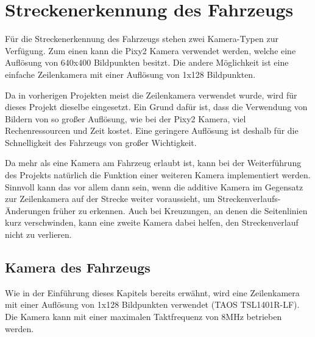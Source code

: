 

\pagestyle{fancy}
\rhead{\thepage} \chead{} 
\cfoot{}

\section{Streckenerkennung des Fahrzeugs}\label{Sec7}

Für die Streckenerkennung des Fahrzeugs stehen zwei Kamera-Typen zur Verfügung. Zum einen kann die Pixy2 Kamera verwendet werden, welche eine Auflösung von 640x400 Bildpunkten besitzt. Die andere Möglichkeit ist eine einfache Zeilenkamera mit einer Auflösung von 1x128 Bildpunkten.\vspace{11pt}

Da in vorherigen Projekten meist die Zeilenkamera verwendet wurde, wird für dieses Projekt dieselbe eingesetzt. Ein Grund dafür ist, dass die Verwendung von Bildern von so großer Auflösung, wie bei der Pixy2 Kamera, viel Rechenressourcen und Zeit kostet. Eine geringere Auflösung ist deshalb für die Schnelligkeit des Fahrzeugs von großer Wichtigkeit. \vspace{11pt}

Da mehr als eine Kamera am Fahrzeug erlaubt ist, kann bei der Weiterführung des Projekts natürlich die Funktion einer weiteren Kamera implementiert werden. Sinnvoll kann das vor allem dann sein, wenn die additive Kamera im Gegensatz zur Zeilenkamera auf der Strecke weiter voraussieht, um Streckenverlaufs-Änderungen früher zu erkennen. Auch bei Kreuzungen, an denen die Seitenlinien kurz verschwinden, kann eine zweite Kamera dabei helfen, den Streckenverlauf nicht zu verlieren.

\subsection{Kamera des Fahrzeugs}\label{Sec7Sub1}

Wie in der Einführung dieses Kapitels bereits erwähnt, wird eine Zeilenkamera mit einer Auflösung von 1x128 Bildpunkten verwendet (TAOS TSL1401R-LF). Die Kamera kann mit einer maximalen Taktfrequenz von 8MHz betrieben werden.

